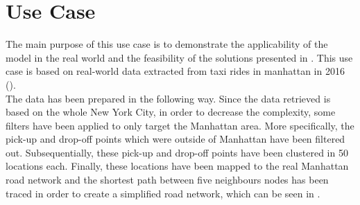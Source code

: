 \section{Use Case}
The main purpose of this use case is to demonstrate the applicability of the model in the real world and the feasibility of the solutions presented in . This use case is based on real-world data extracted from taxi rides in manhattan in 2016 (\cite{Donovan2014}). \\
The data has been prepared in the following way. Since the data retrieved is based on the whole New York City, in order to decrease the complexity, some filters have been applied to only target the Manhattan area. More specifically, the pick-up and drop-off points which were outside of Manhattan have been filtered out. Subsequentially, these pick-up and drop-off points have been clustered in 50 locations each. Finally, these locations have been mapped to the real Manhattan road network and the shortest path between five neighbours nodes has been traced in order to create a simplified road network, which can be seen in . 
